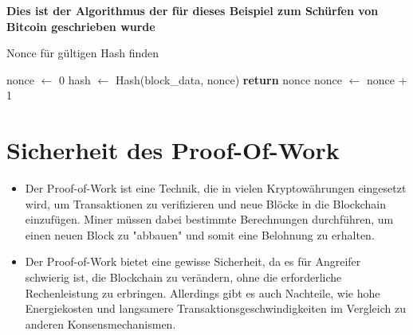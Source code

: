 \documentclass[ngerman]{scrreprt}
\begin{document}
\begin{Large}
	\textbf{Dies ist der Algorithmus \textcommabelow der für dieses Beispiel zum Schürfen von Bitcoin geschrieben wurde} \\
\end{Large}
\begin{algorithm}
	\caption{Nonce für gültigen Hash finden}
	\label{alg:nonce_find}
	
	\begin{algorithmic}[1]
		\State nonce $\gets$ 0
		\Repeat
		\State hash $\gets$ Hash(block\_data, nonce)
		\State \textbf{return} nonce
		\EndIf
		\State nonce $\gets$ nonce + 1
	\end{algorithmic}
\end{algorithm}

\newpage
\section{Sicherheit des Proof-Of-Work}

\begin{itemize}
	\item Der Proof-of-Work ist eine Technik, die in vielen Kryptowährungen eingesetzt wird, um Transaktionen zu verifizieren und neue Blöcke in die Blockchain einzufügen. Miner müssen dabei bestimmte Berechnungen durchführen, um einen neuen Block zu "abbauen" und somit eine Belohnung zu erhalten.
	
	\item Der Proof-of-Work bietet eine gewisse Sicherheit, da es für Angreifer schwierig ist, die Blockchain zu verändern, ohne die erforderliche Rechenleistung zu erbringen. Allerdings gibt es auch Nachteile, wie hohe Energiekosten und langsamere Transaktionsgeschwindigkeiten im Vergleich zu anderen Konsensmechanismen.
\end{itemize}

\newpage
\end{document}
